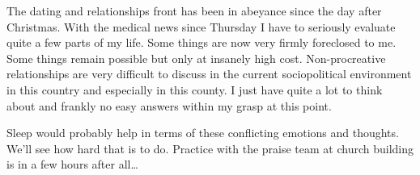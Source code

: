 The dating and relationships front has been in abeyance since the day
after Christmas. With the medical news since Thursday I have to
seriously evaluate quite a few parts of my life. Some things are now
very firmly foreclosed to me. Some things remain possible but only at
insanely high cost. Non-procreative relationships are very difficult to
discuss in the current sociopolitical environment in this country and
especially in this county. I just have quite a lot to think about and
frankly no easy answers within my grasp at this point.

Sleep would probably help in terms of these conflicting emotions and
thoughts. We'll see how hard that is to do. Practice with the praise
team at church building is in a few hours after all\ldots{}
